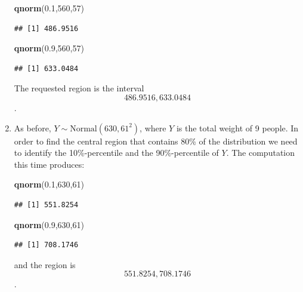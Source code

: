 \documentclass[
]{krantz}
\makeatletter
\newenvironment{Shaded}{\begin{snugshade}}{\end{snugshade}}
\newcommand{\DecValTok}[1]{\textcolor[rgb]{0.00,0.00,0.81}{#1}}
\newcommand{\FloatTok}[1]{\textcolor[rgb]{0.00,0.00,0.81}{#1}}
\newcommand{\KeywordTok}[1]{\textcolor[rgb]{0.13,0.29,0.53}{\textbf{#1}}}
\newcommand{\NormalTok}[1]{#1}
\newenvironment{kframe}{%
\medskip{}
\setlength{\fboxsep}{.8em}
 \def\at@end@of@kframe{}%
 \ifinner\ifhmode%
  \def\at@end@of@kframe{\end{minipage}}%
  \begin{minipage}{\columnwidth}%
 \fi\fi%
 \def\FrameCommand##1{\hskip\@totalleftmargin \hskip-\fboxsep
 \colorbox{shadecolor}{##1}\hskip-\fboxsep
     \hskip-\linewidth \hskip-\@totalleftmargin \hskip\columnwidth}%
 \MakeFramed {\advance\hsize-\width
   \@totalleftmargin\z@ \linewidth\hsize
   \@setminipage}}%
 {\par\unskip\endMakeFramed%
 \at@end@of@kframe}
\renewenvironment{Shaded}{\begin{kframe}}{\end{kframe}}
\theoremstyle{definition}
\theoremstyle{definition}
\theoremstyle{definition}
\theoremstyle{remark}
\makeatother
\begin{document}
\begin{enumerate}
\begin{Shaded}
\begin{Highlighting}[]
\KeywordTok{qnorm}\NormalTok{(}\FloatTok{0.1}\NormalTok{,}\DecValTok{560}\NormalTok{,}\DecValTok{57}\NormalTok{)}
\end{Highlighting}
\end{Shaded}

\begin{verbatim}
## [1] 486.9516
\end{verbatim}

\begin{Shaded}
\begin{Highlighting}[]
\KeywordTok{qnorm}\NormalTok{(}\FloatTok{0.9}\NormalTok{,}\DecValTok{560}\NormalTok{,}\DecValTok{57}\NormalTok{)}
\end{Highlighting}
\end{Shaded}

\begin{verbatim}
## [1] 633.0484
\end{verbatim}

  The requested region is the interval \[486.9516, 633.0484\].
\item
  As before,
  \(Y \sim \mbox{Normal}(630, 61^2)\), where \(Y\) is the total weight of 9
  people. In order to find the central region that contains 80\% of the
  distribution we need to identify the 10\%-percentile and the
  90\%-percentile of \(Y\). The computation this time produces:

\begin{Shaded}
\begin{Highlighting}[]
\KeywordTok{qnorm}\NormalTok{(}\FloatTok{0.1}\NormalTok{,}\DecValTok{630}\NormalTok{,}\DecValTok{61}\NormalTok{)}
\end{Highlighting}
\end{Shaded}

\begin{verbatim}
## [1] 551.8254
\end{verbatim}

\begin{Shaded}
\begin{Highlighting}[]
\KeywordTok{qnorm}\NormalTok{(}\FloatTok{0.9}\NormalTok{,}\DecValTok{630}\NormalTok{,}\DecValTok{61}\NormalTok{)}
\end{Highlighting}
\end{Shaded}

\begin{verbatim}
## [1] 708.1746
\end{verbatim}

  and the region is \[551.8254, 708.1746\].
\end{enumerate}
\end{document}
